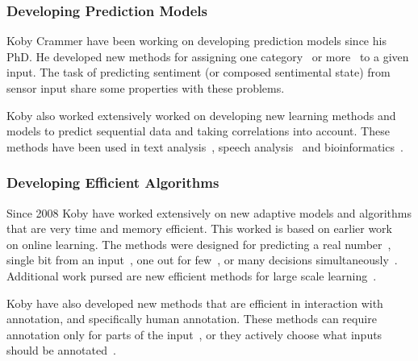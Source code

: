 \documentclass[12pt]{article}
\begin{document}
\subsubsection*{Developing Prediction Models}
Koby Crammer have been working on developing prediction models since his PhD. He developed new methods for assigning one category~\cite{CrammerSi00,CrammerSi00a,CrammerSi01,CrammerSi01a,CrammerDrKu09,DBLP:journals/jmlr/LivniCG12,DBLP:conf/icml/WangCV10,DBLP:conf/ijcai/VatashskyC13,DBLP:journals/jmlr/WangCV12}
 or more~\cite{CrammerSi03,DBLP:conf/naacl/McDonaldCP05} to a given input. The task of predicting sentiment (or composed sentimental state) from sensor input share some properties with these problems.
 
 Koby also worked extensively worked on developing new learning methods and models to predict sequential data and taking correlations into account. These methods have been used in text analysis~\cite{mcdonald-04,mejer2010confidence}, speech analysis~\cite{DBLP:conf/icassp/CrammerL12,DBLP:conf/icassp/Crammer10} and bioinformatics~\cite{DBLP:journals/bioinformatics/BernalCP12,DBLP:journals/ploscb/BernalCHP07,DBLP:journals/bmcbi/LiuCPR08}.


\subsubsection*{Developing Efficient Algorithms}
Since 2008 Koby have worked extensively on new adaptive models and algorithms that are very time and memory efficient. This worked is based on earlier work~\cite{DBLP:journals/jmlr/CrammerDKSS06} on online learning. The methods were designed for predicting a real number~\cite{CrammerKuDr12,MoroshkoC12}, single bit from an input~\cite{DBLP:journals/ml/CrammerKD13,Crammer:2012:CLC:2343676.2343704,DBLP:conf/nips/CrammerL10}, one out for few~\cite{CrammerDrKu09,dredze-ml-09}, or many decisions simultaneously~\cite{mejer2012training,DBLP:conf/icassp/CrammerL12}. Additional work pursed are new efficient methods for large scale learning~\cite{DBLP:conf/icml/WangCV10,DBLP:journals/jmlr/WangCV12}.

Koby have also developed new methods that are efficient in interaction with annotation, and specifically human annotation. These methods can require annotation only for parts of the input~\cite{DBLP:journals/jmlr/HaimovitchCM12,DBLP:conf/pkdd/OrbachC12,OrbachCr12ieeei}, or they actively choose what inputs should be annotated~\cite{dredze-08b,DBLP:journals/ml/CrammerG13,mejer2012training}.
\end{document}
